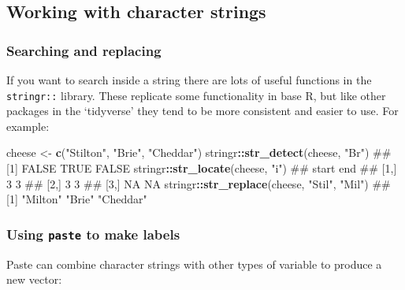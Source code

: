 \documentclass[]{article}
\newenvironment{Shaded}{\begin{snugshade}}{\end{snugshade}}
\newcommand{\KeywordTok}[1]{\textcolor[rgb]{0.13,0.29,0.53}{\textbf{#1}}}
\newcommand{\DecValTok}[1]{\textcolor[rgb]{0.00,0.00,0.81}{#1}}
\newcommand{\StringTok}[1]{\textcolor[rgb]{0.31,0.60,0.02}{#1}}
\newcommand{\OperatorTok}[1]{\textcolor[rgb]{0.81,0.36,0.00}{\textbf{#1}}}
\newcommand{\NormalTok}[1]{#1}
\theoremstyle{definition}
\theoremstyle{definition}
\theoremstyle{definition}
\theoremstyle{remark}
\begin{document}
\hypertarget{string-handling}{\subsection*{Working with character
strings}\label{string-handling}}

\subsubsection{Searching and replacing}\label{searching-and-replacing}

If you want to search inside a string there are lots of useful functions
in the \texttt{stringr::} library. These replicate some functionality in
base R, but like other packages in the `tidyverse' they tend to be more
consistent and easier to use. For example:

\begin{Shaded}
\begin{Highlighting}[]
\NormalTok{cheese <-}\StringTok{ }\KeywordTok{c}\NormalTok{(}\StringTok{"Stilton"}\NormalTok{, }\StringTok{"Brie"}\NormalTok{, }\StringTok{"Cheddar"}\NormalTok{)}
\NormalTok{stringr}\OperatorTok{::}\KeywordTok{str_detect}\NormalTok{(cheese, }\StringTok{"Br"}\NormalTok{)}
\NormalTok{## [1] FALSE  TRUE FALSE}
\NormalTok{stringr}\OperatorTok{::}\KeywordTok{str_locate}\NormalTok{(cheese, }\StringTok{"i"}\NormalTok{)}
\NormalTok{##      start end}
\NormalTok{## [1,]     3   3}
\NormalTok{## [2,]     3   3}
\NormalTok{## [3,]    NA  NA}
\NormalTok{stringr}\OperatorTok{::}\KeywordTok{str_replace}\NormalTok{(cheese, }\StringTok{"Stil"}\NormalTok{, }\StringTok{"Mil"}\NormalTok{)}
\NormalTok{## [1] "Milton"  "Brie"    "Cheddar"}
\end{Highlighting}
\end{Shaded}

\hypertarget{paste}{\subsubsection*{\texorpdfstring{Using \texttt{paste}
to make labels}{Using paste to make labels}}\label{paste}}

Paste can combine character strings with other types of variable to
produce a new vector:

\begin{Shaded}
\end{Shaded}
\end{document}
